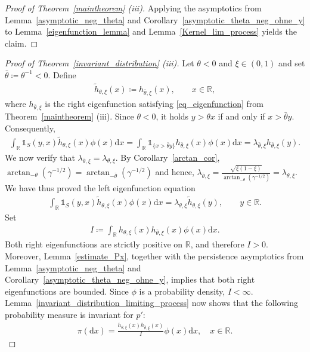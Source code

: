 \documentclass[12pt]{article}
\newcommand{\R}{\mathbb{R}} %
\newcommand{\1}{\mathds{1}}
\renewcommand{\d}{\mathrm{d}}
\theoremstyle{definition}
\theoremstyle{plain}
\theoremstyle{remark}
\begin{document}
\begin{proof}[Proof of Theorem~\ref{maintheorem} (iii)]
Applying the asymptotics from Lemma~\ref{asymptotic_neg_theta} and Corollary~\ref{asymptotic_theta_neg_ohne_y} to Lemma~\ref{eigenfunction_lemma} and Lemma~\ref{Kernel_lim_process} yields the claim.
\end{proof}
\begin{proof}[Proof of Theorem~\ref{invariant_distribution} (iii)]
Let $\theta<0$ and $\xi\in(0,1)$ and set $\bar\theta\coloneqq \theta^{-1}<0$. Define 
\begin{align*} 
\tilde h_{\theta,\xi}(x) \coloneqq h_{\bar\theta,\xi}(x), \qquad x\in\R,
\end{align*}
where $h_{\bar\theta,\xi}$ is the right eigenfunction satisfying \eqref{eq_eigenfunction} from Theorem~\ref{maintheorem} (iii).
Since $\theta<0$, it holds $ y>\theta x $ if and only if $ x>\bar\theta y $. Consequently, 
\begin{align*} 
\int_\R \mathds{1}_S(y,x) \tilde h_{\theta,\xi}(x) \phi(x)\d x 
= \int_\R \mathds{1}_{\{x>\bar\theta y\}} h_{\bar\theta,\xi}(x) \phi(x)\d x
= \lambda_{\bar\theta ,\xi} h_{\bar\theta ,\xi}(y). 
\end{align*} 
We now verify that $ \lambda_{\bar\theta ,\xi} = \lambda_{\theta,\xi}$. By Corollary~\ref{arctan_cor}, $ \arctan_{-\theta}(\gamma^{-1/2}) = \arctan_{-\bar\theta}(\gamma^{-1/2})$ and hence, $ \lambda_{\bar\theta ,\xi} = \frac{ \sqrt{\xi(1-\xi)} }{ \arctan_{-\theta}(\gamma^{-1/2}) }=\lambda_{\theta,\xi}$. We have thus proved the left eigenfunction equation 
\begin{align*} 
\int_\R \mathds{1}_S(y,x) \tilde h_{\theta,\xi}(x) \phi(x)\d x = \lambda_{\theta,\xi} \tilde h_{\theta,\xi}(y), \qquad y\in\R. 
\end{align*} 
Set 
\begin{align*}
I  \coloneqq \int_\R h_{\theta,\xi}(x) h_{\bar\theta ,\xi}(x) \phi(x)\d x.
\end{align*} 
Both right eigenfunctions are strictly positive on $\R$, and therefore $ I >0$. Moreover, Lemma~\ref{estimate_Px}, together with the persistence asymptotics from Lemma~\ref{asymptotic_neg_theta} and Corollary~\ref{asymptotic_theta_neg_ohne_y}, implies that both right eigenfunctions are bounded. Since $\phi$ is a probability density, $ I <\infty$. Lemma~\ref{invariant_distribution_limiting_process} now shows that the following probability measure is invariant for $p'$:
\begin{align*} 
\pi (\d x) = \frac{ h_{\theta,\xi}(x) h_{\bar\theta ,\xi}(x) }{I} \phi(x)\d x, \quad x\in\R.
\end{align*} 



\end{proof}
\end{document}
